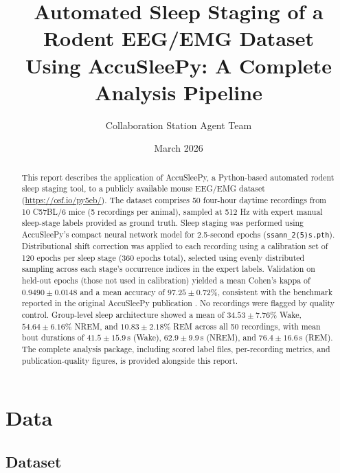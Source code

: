 \documentclass[12pt,a4paper]{article}
\title{Automated Sleep Staging of a Rodent EEG/EMG Dataset\\
       Using AccuSleePy: A Complete Analysis Pipeline}
\author{Collaboration Station Agent Team}
\date{March 2026}
\begin{document}
\maketitle

\begin{abstract}

This report describes the application of AccuSleePy, a Python-based automated
rodent sleep staging tool, to a publicly available mouse EEG/EMG dataset
\citep{Barger2019, BargerOSF2025} (\url{https://osf.io/py5eb/}). The dataset comprises 50 four-hour daytime recordings from
10 C57BL/6 mice (5 recordings per animal), sampled at 512 Hz with expert manual
sleep-stage labels provided as ground truth. Sleep staging was performed using
AccuSleePy's compact neural network model for 2.5-second epochs
(\texttt{ssann\_2(5)s.pth}). Distributional shift correction was applied to each
recording using a calibration set of 120 epochs per sleep stage (360 epochs
total), selected using evenly distributed sampling across each stage's occurrence
indices in the expert labels. Validation on held-out epochs (those not used in
calibration) yielded a mean Cohen's kappa of $0.9490 \pm 0.0148$ and a mean
accuracy of $97.25 \pm 0.72\%$, consistent with the benchmark reported in the
original AccuSleePy publication \citep{Barger2019}. No recordings were flagged
by quality control. Group-level sleep architecture showed a mean of
$34.53 \pm 7.76\%$ Wake, $54.64 \pm 6.16\%$ NREM, and $10.83 \pm 2.18\%$ REM
across all 50 recordings, with mean bout durations of $41.5 \pm 15.9$\,s
(Wake), $62.9 \pm 9.9$\,s (NREM), and $76.4 \pm 16.6$\,s (REM). The complete
analysis package, including scored label files, per-recording metrics, and
publication-quality figures, is provided alongside this report.

\end{abstract}

\tableofcontents
\newpage

\section{Data}

\subsection{Dataset}
\end{document}
